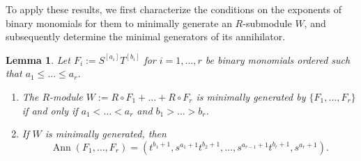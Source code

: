 \documentclass[a4paper, 11pt]{amsart}
\numberwithin{theorem}{section}
\newtheorem{lemma}[theorem]{Lemma}
\theoremstyle{definition}
\numberwithin{equation}{section}
\DeclareMathOperator{\Ann}{\operatorname{Ann}}
\begin{document}
To apply these results, we first characterize the conditions on the exponents of binary monomials for them to minimally generate an $R$-submodule $W$, and subsequently determine the minimal generators of its annihilator.
\begin{lemma}\label{lem:monomialsimultaneousrank}
Let $F_i := S^{[a_i]}T^{[b_i]}$ for $i = 1, \dots, r$ be binary monomials ordered such that $a_1 \leq \dots \leq a_r$. 
\begin{enumerate}
    \item\label{lem:monomialMinGensCond} The $R$-module $W := R \circ F_1 + \dots + R \circ F_r$ is minimally generated by $\{F_1, \dots, F_r\}$ if and only if $a_1 < \dots < a_r$ and $b_1 > \dots > b_r$.
    \item\label{lem:monomialAnn} If $W$ is minimally generated, then
    \[
    \Ann(F_1, \dots, F_r) = (t^{b_1+1}, s^{a_1+1}t^{b_2+1}, \dots, s^{a_{r-1}+1}t^{b_r+1}, s^{a_r+1}).
    \]
\end{enumerate}
\end{lemma}
\end{document}
